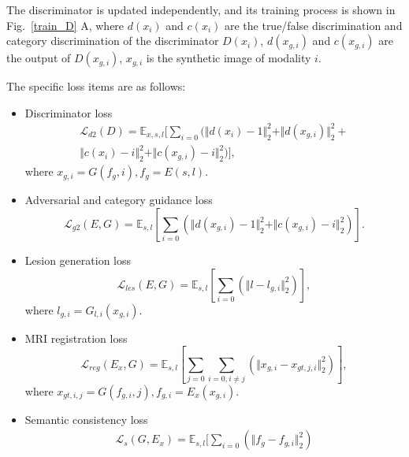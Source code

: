 \documentclass{ecai}
\begin{document}
The discriminator is updated independently, and its training process is shown in Fig.~\ref{train_D} A, 
where $d(x_{i})$ and $c(x_{i})$ are the true/false discrimination and category discrimination of the discriminator $D(x_i)$, $d(x_{g, i})$ and $c(x_{g,i})$ are the output of $D(x_{g,i})$, $x_{g,i}$ is the synthetic image of modality $i$. 

The specific loss items are as follows:
\begin{itemize}
	\item{Discriminator loss }
	\begin{equation}
	\begin{split}
	\mathcal{L}_{d2}(D)=\mathbb{E}_{x,s,l}[\sum\limits_{i=0}(\Vert{d(x_i)-1}\Vert_{2}^{2}+\Vert{d(x_{g,i})}\Vert_{2}^{2}+\\
	\Vert{c(x_i)-i}\Vert_{2}^{2}+\Vert{c(x_{g,i})-i}\Vert_{2}^{2})],
	\end{split}
	\end{equation}
	where $x_{g,i}=G(f_g,i),f_g=E(s,l)$.
	\item{Adversarial and category guidance loss}
	\begin{equation}
		\mathcal{L}_{g2}(E,G)=\mathbb{E}_{s,l}[\sum\limits_{i=0}(\Vert{d(x_{g,i})-1}\Vert_{2}^{2}+\Vert{c(x_{g,i})-i}\Vert_{2}^{2})].
	\end{equation}
	\item{Lesion generation loss}
	\begin{equation}
		\mathcal{L}_{les}(E,G)=\mathbb{E}_{s,l}[\sum\limits_{i=0}(\Vert{l-l_{g,i}}\Vert_{2}^{2})],
	\end{equation}
	where $l_{g,i}=G_{l,i}(x_{g,i})$.
	\item{MRI registration loss}
	\begin{equation}
		\mathcal{L}_{reg}(E_x,G)=\mathbb{E}_{s,l}[\sum\limits_{j=0}\sum\limits_{i=0,i\neq j}(\Vert{x_{g,i}-x_{gt,j,i}}\Vert_{2}^{2})],
	\end{equation}
	where $x_{gt,i,j}=G(f_{g,i},j),f_{g,i}=E_x(x_{g,i})$.
	\item{Semantic consistency loss}
	\begin{equation}
	\begin{split}
		\mathcal{L}_{s}(G,E_x)=\mathbb{E}_{s,l}[\sum\limits_{i=0}(\Vert{f_g-f_{g,i}}\Vert_{2}^{2})\end{split}
	\end{equation}
	
\end{itemize}
\end{document}
